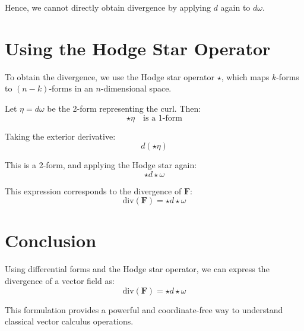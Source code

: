 \documentclass{article}
\begin{document}
Hence, we cannot directly obtain divergence by applying $d$ again to $d\omega$.

\section*{Using the Hodge Star Operator}

To obtain the divergence, we use the Hodge star operator $\star$, which maps $k$-forms to $(n-k)$-forms in an $n$-dimensional space.

Let $\eta = d\omega$ be the 2-form representing the curl. Then:
\[
\star \eta \quad \text{is a 1-form}
\]

Taking the exterior derivative:
\[
d(\star \eta)
\]

This is a 2-form, and applying the Hodge star again:
\[
\star d \star \omega
\]

This expression corresponds to the divergence of $\mathbf{F}$:
\[
\text{div}(\mathbf{F}) = \star d \star \omega
\]

\section*{Conclusion}

Using differential forms and the Hodge star operator, we can express the divergence of a vector field as:
\[
\text{div}(\mathbf{F}) = \star d \star \omega
\]

This formulation provides a powerful and coordinate-free way to understand classical vector calculus operations.
\end{document}
